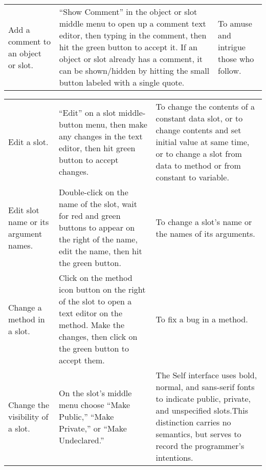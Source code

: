 \documentclass[letterpaper,10pt,english]{sphinxmanual}
\begin{document}
\noindent\begin{tabulary}{\linewidth}{p{5cm} p{5cm} p{5cm}}
\hline
&
&\\
\hline
Add a comment to an object or slot.
&
“Show Comment” in the object or slot middle menu to open up a comment text editor, then typing in the comment, then hit the green button to accept it. If an object or slot already has a comment, it can be shown/hidden by hitting the
small button labeled with a single quote.
&
To amuse and intrigue those who follow.
\\
\hline\end{tabulary}


\noindent\begin{tabulary}{\linewidth}{p{5cm} p{5cm} p{5cm}}
\hline
&
&\\
\hline
Edit a slot.
&
“Edit” on a slot middle-button menu, then make any changes in the text editor, then hit green button to accept changes.
&
To change the contents of a constant data slot, or to change contents and set initial value at same time, or to change a slot from data to method or from constant to variable.
\\
\hline
Edit slot name or its argument names.
&
Double-click on the name of the slot, wait for red and green buttons to appear on the right of the name, edit the name, then hit the green button.
&
To change a slot’s name or the names of its arguments.
\\
\hline
Change a method in a slot.
&
Click on the method icon button on the right of the slot to open a text editor on the method. Make the changes, then click on the green button to accept them.
&
To fix a bug in a method.
\\
\hline
Change the visibility of a slot.
&
On the slot’s middle menu choose “Make Public,” “Make Private,” or “Make Undeclared.”
&
The Self interface uses bold, normal, and sans-serif fonts to indicate public, private, and unspecified slots.This distinction carries no semantics, but serves to record the programmer’s intentions.
\\
\hline\end{tabulary}
\end{document}
